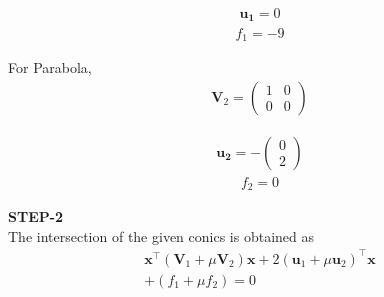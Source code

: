 \documentclass[10pt,a4paper]{report}
\newcommand{\myvec}[1]{\ensuremath{\begin{pmatrix}#1\end{pmatrix}}}
\let\vec\mathbf
\let\vec\mathbf
\providecommand{\brak}[1]{\ensuremath{\left(#1\right)}}
\begin{document}
\begin{multicols}{2}
\begin{align}
\vec{u_1}=0
\end{align} 
\begin{align}
f_1=-9
\end{align} \vspace{2mm}

For Parabola,\\\vspace{1mm}
\begin{align}
\vec{V}_2=\myvec{
1 & 0\\
0 & 0
}
\end{align} 

\begin{align}
\vec{u_2}= -\myvec{
0\\
2
}
\end{align} 
\begin{align}
f_2=0
\end{align} \vspace{2mm}

\textbf{STEP-2}\vspace{2mm}\\
The intersection of the given conics is obtained
as\\
\begin{align}
	\vec{x}^{\top}\brak{\vec{V}_1 + \mu\vec{V}_2}\vec{x}+2 \brak{\vec{u}_1+\mu \vec{u}_2}^{\top} \vec{x} 
	\\
	+ \brak{f_1+\mu f_2}= 0
    \end{align}
    

\end{multicols}
\end{document}

